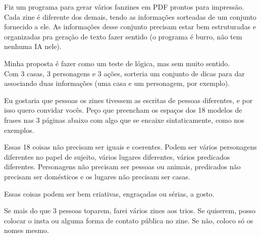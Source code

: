 \documentclass[12pt]{article}
\begin{document}
	
	Fiz um programa para gerar vários fanzines em PDF prontos para impressão.
	\\ Cada zine é diferente dos demais, tendo as informações sorteadas de um conjunto fornecido a ele.
	As informações desse conjunto precisam estar bem estruturadas e organizadas pra geração de texto fazer sentido (o programa é burro, não tem nenhuma IA nele).
	
	\vfill
	
	Minha proposta é fazer como um teste de lógica, mas sem muito sentido.
	\\ Com 3 casas, 3 personagens e 3 ações, sorteria um conjunto de dicas para dar associando duas informações (uma casa e um personagem, por exemplo).
	
	\vfill
	
	Eu gostaria que pessoas os zines tivessem as escritas de pessoas diferentes, e por isso quero convidar vocês.
	Peço que preencham os espaços dos 18 modelos de frases nas 3 páginas abaixo com algo que se encaixe sintaticamente, como nos exemplos.
	
	\vfill
	
	Essas 18 coisas não precisam ser iguais e coerentes. 
	Podem ser vários personagens diferentes no papel de sujeito, vários lugares diferentes, vários predicados diferentes.
	Personagens não precisam ser pessoas ou animais, predicados não precisam ser domésticos e os lugares não precisam ser casas.
	
	Essas coisas podem ser bem criativas, engraçadas ou sérias, a gosto.
	
	\vfill
	
	
	\vfill
	
	Se mais do que 3 pessoas toparem, farei vários zines aos trios.
	Se quiserem, posso colocar o insta ou alguma forma de contato pública no zine.
	Se não, coloco só os nomes mesmo.
	
	
	\newpage
\end{document}
